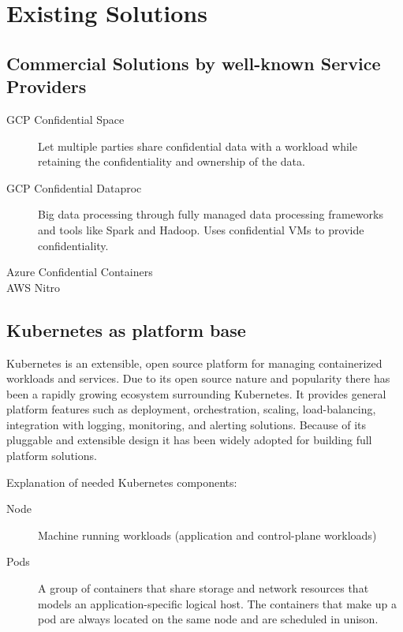 \section{Existing Solutions}

\subsection{Commercial Solutions by well-known Service Providers}

\begin{description}
  \item[GCP Confidential Space]
    Let multiple parties share confidential data with a workload while retaining
    the confidentiality and ownership of the data.
  \item[GCP Confidential Dataproc]
    Big data processing through fully managed data processing frameworks and
    tools like Spark and Hadoop. Uses confidential VMs to provide
    confidentiality.
  \item[Azure Confidential Containers]
  \item[AWS Nitro]
\end{description}


\subsection{Kubernetes as platform base}

Kubernetes is an extensible, open source platform for managing containerized
workloads and services. Due to its open source nature and popularity there has
been a rapidly growing ecosystem surrounding Kubernetes. It provides general
platform features such as deployment, orchestration, scaling, load-balancing,
integration with logging, monitoring, and alerting solutions. Because of its
pluggable and extensible design it has been widely adopted for building full
platform solutions.

Explanation of needed Kubernetes components:

\begin{description}
  \item[Node]
    Machine running workloads (application and control-plane workloads)
  \item[Pods]
    A group of containers that share storage and network resources that models
    an application-specific logical host. The containers that make up a pod are
    always located on the same node and are scheduled in unison.
\end{description}

